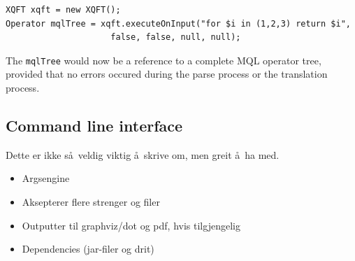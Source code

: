 \begin{Verbatim}
XQFT xqft = new XQFT();
Operator mqlTree = xqft.executeOnInput("for $i in (1,2,3) return $i", 
                     false, false, null, null);
\end{Verbatim}

The \texttt{mqlTree} would now be a reference to a complete MQL operator tree,
provided that no errors occured during the parse process or the translation
process.

\subsection{Command line interface}
Dette er ikke s\aa~veldig viktig \aa~skrive om, men greit \aa~ha med.
\begin{itemize}
  \item Argsengine
  \item Aksepterer flere strenger og filer
  \item Outputter til graphviz/dot og pdf, hvis tilgjengelig
  \item Dependencies (jar-filer og drit)
\end{itemize}